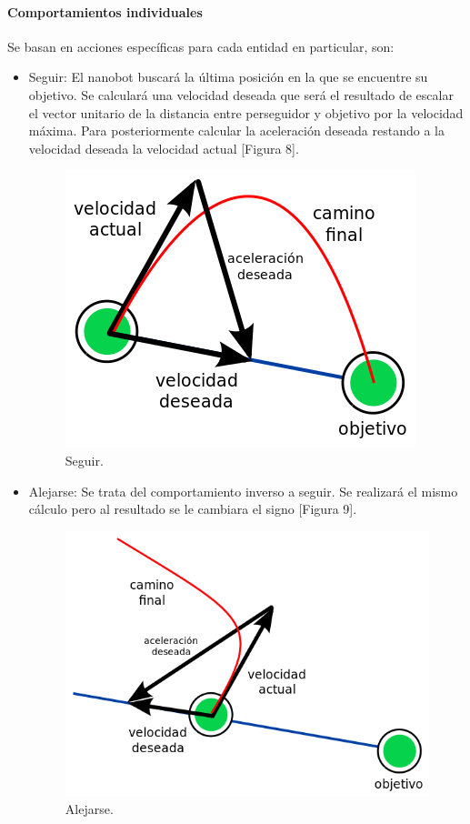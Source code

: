 \paragraph{Comportamientos individuales}
Se basan en acciones específicas para cada entidad en particular, son:  
\begin{itemize}
 \item Seguir: El nanobot buscará la última posición en la que se encuentre su objetivo. Se calculará una velocidad deseada que será el resultado de escalar el vector unitario de la distancia entre perseguidor y objetivo por la velocidad máxima. Para posteriormente calcular la aceleración deseada restando a la velocidad deseada la velocidad actual [Figura 8]. 
 
 \begin{figure}[H]
 \centering
 \includegraphics[scale=0.4]{../images/seek.png}
 \caption{Seguir.}
 \label{fig:../images/seek.png}
 \end{figure}

\item Alejarse: Se trata del comportamiento inverso a seguir. Se realizará el mismo cálculo pero al resultado se le cambiara el signo [Figura 9]. 

 \begin{figure}[H]
 \centering
 \includegraphics[scale=0.4]{../images/flee.png}
 \caption{Alejarse.}
 \label{fig:../images/flee.png}
 \end{figure}


\end{itemize}
